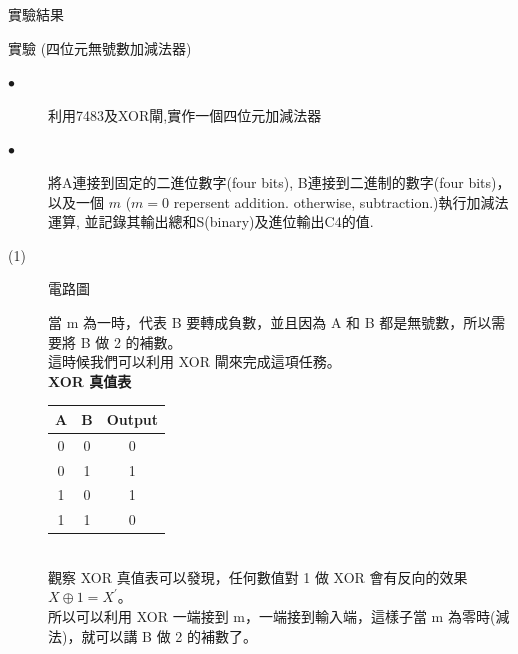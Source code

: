 \documentclass[12pt, a4paper]{article}
\begin{document}
\begin{description}
\begin{enumerate}
        \normalsize
      \end{enumerate}
    \item [二、]實驗結果
      \begin{description}
        \fontsize{20pt}{22pt}\selectfont
        \item 實驗 (四位元無號數加減法器)
          \fontsize{16pt}{18pt}\selectfont
            \begin{description}
              \item [$\bullet$]利用7483及XOR閘,實作一個四位元加減法器
              \item [$\bullet$]將A連接到固定的二進位數字(four bits), B連接到二進制的數字(four bits)，以及一個 $m$ ($m=0$ repersent addition. otherwise, subtraction.)執行加減法運算, 並記錄其輸出總和S(binary)及進位輸出C4的值.\\
              \fontsize{18pt}{20pt}
                \item [(1)]電路圖 \\[.3cm]
                \begin{samepage}
                  \fontsize{16pt}{18pt}
                    當 m 為一時，代表 B 要轉成負數，並且因為 A 和 B 都是無號數，所以需要將 B 做 2 的補數。
                    \\這時候我們可以利用 XOR 閘來完成這項任務。\\[.5cm]
                    \bf{XOR 真值表}\\[.3cm]
                      \normalfont
                      \begin{tabular}{|c|c|c|}
                        \hline
                        A & B & Output \\
                        \hline
                        0 & 0 & 0 \\
                        \hline
                        0 & 1 & 1 \\
                        \hline
                        1 & 0 & 1 \\
                        \hline
                        1 & 1 & 0 \\
                        \hline
                      \end{tabular}
                      \\[.4cm] 觀察 XOR 真值表可以發現，任何數值對 1 做 XOR 會有反向的效果  $X \oplus 1 = X^{'}$。
                      \\ 所以可以利用 XOR 一端接到 m，一端接到輸入端，這樣子當 m 為零時(減法)，就可以講 B 做 2 的補數了。\\
                \end{samepage}
    

\end{description}
\end{description}
\end{description}
\end{document}
